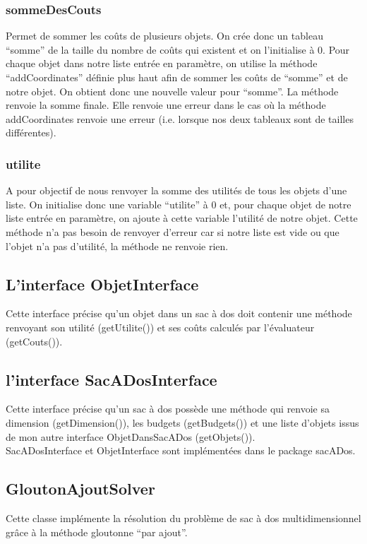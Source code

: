 \documentclass[11pt]{article}
\begin{document}
\subsubsection{sommeDesCouts}
Permet de sommer les coûts de plusieurs objets. On crée donc un tableau “somme” de la taille du nombre de coûts qui existent et on l’initialise à 0. Pour chaque objet dans notre liste entrée en paramètre, on utilise la méthode “addCoordinates” définie plus haut afin de sommer les coûts de “somme” et de notre objet. On obtient donc une nouvelle valeur pour “somme”. La méthode renvoie la somme finale. Elle renvoie une erreur dans le cas où la méthode addCoordinates renvoie une erreur (i.e. lorsque nos deux tableaux sont de tailles différentes).

\subsubsection{utilite}
A pour objectif de nous renvoyer la somme des utilités de tous les objets d’une liste. On initialise donc une variable “utilite” à 0 et, pour chaque objet de notre liste entrée en paramètre, on ajoute à cette variable l’utilité de notre objet. Cette méthode n’a pas besoin de renvoyer d’erreur car si notre liste est vide ou que l’objet n’a pas d’utilité, la méthode ne renvoie rien.


\subsection{L’interface ObjetInterface}
Cette interface précise qu’un objet dans un sac à dos doit contenir une méthode renvoyant son utilité (getUtilite()) et ses coûts calculés par l’évaluateur (getCouts()). 

\subsection{l’interface SacADosInterface}
Cette interface précise qu’un sac à dos possède une méthode qui renvoie sa dimension (getDimension()), les budgets  (getBudgets()) et une liste d’objets issus de mon autre interface ObjetDansSacADos (getObjets()). 
\\

SacADosInterface et ObjetInterface sont implémentées dans le package sacADos.

\subsection{GloutonAjoutSolver}
Cette classe implémente la résolution du problème de sac à dos multidimensionnel grâce à la méthode gloutonne “par  ajout”. 
\end{document}
